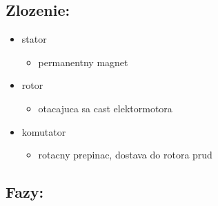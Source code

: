 \documentclass[
]{article}
\providecommand{\tightlist}{%
  \setlength{\itemsep}{0pt}\setlength{\parskip}{0pt}}
\begin{document}
\hypertarget{zlozenie}{%
\subsection{Zlozenie:}\label{zlozenie}}

\begin{itemize}
\tightlist
\item
  stator

  \begin{itemize}
  \tightlist
  \item
    permanentny magnet
  \end{itemize}
\item
  rotor

  \begin{itemize}
  \tightlist
  \item
    otacajuca sa cast elektormotora
  \end{itemize}
\item
  komutator

  \begin{itemize}
  \tightlist
  \item
    rotacny prepinac, dostava do rotora prud
  \end{itemize}
\end{itemize}

\hypertarget{fazy}{%
\subsection{Fazy:}\label{fazy}}
\end{document}
